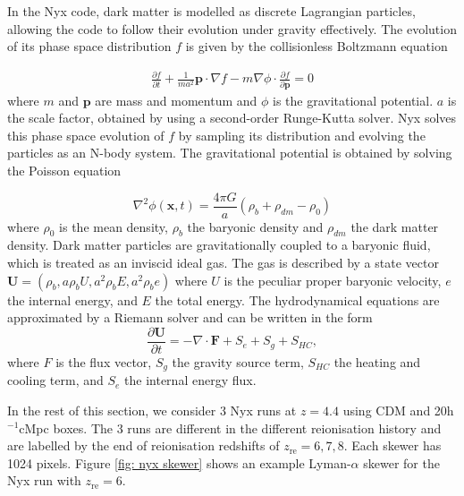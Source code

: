 In the Nyx code, dark matter is modelled as discrete Lagrangian particles, allowing the code to follow their evolution under gravity effectively. The evolution of its phase space distribution $f$ is given by the collisionless Boltzmann equation

\begin{equation}
    \begin{aligned}\frac{\partial f}{\partial t}+\frac{1}{ma^2}\mathbf{p}\cdot\nabla f-m\nabla\phi\cdot\frac{\partial f}{\partial\mathbf{p}}=0\end{aligned}
\end{equation}
where $m$ and $\mathbf{p}$ are mass and momentum and $\phi$ is the gravitational potential. $a$ is the scale factor, obtained by using a second-order Runge-Kutta solver.
Nyx solves this phase space evolution of $f$ by sampling its distribution and evolving the particles as an N-body system. The gravitational potential is obtained by solving the Poisson equation

\begin{equation}
    \nabla^2\phi(\mathbf{x},t)=\frac{4\pi G}{a}(\rho_b+\rho_{dm}-\rho_0)
\end{equation}
where $\rho_0$ is the mean density, $\rho_b$ the baryonic density and $\rho_{dm}$ the dark matter density.
Dark matter particles are gravitationally coupled to a baryonic fluid, which is treated as an inviscid ideal gas. The gas is described by a state vector $\mathbf{U}=(\rho_b,a\rho_bU,a^2\rho_bE,a^2\rho_be)$ where $U$ is the peculiar proper baryonic velocity, $e$ the internal energy, and $E$ the total energy.
The hydrodynamical equations are approximated by a Riemann solver and can be written in the form
\begin{equation}
    \frac{\partial\mathbf{U}}{\partial t}=-\nabla\cdot\mathbf{F}+S_e+S_g+S_{HC},
\end{equation}
where $F$ is the flux vector, $S_g$ the gravity source term, $S_{HC}$ the heating and cooling term, and $S_e$ the internal energy flux.

In the rest of this section, we consider 3 Nyx runs at $z=4.4$ using CDM and 20h$^{-1}$cMpc boxes. The 3 runs are different in the different reionisation history and are labelled by the end of reionisation redshifts of $z_\mathrm{re}=6,7,8$. Each skewer has 1024 pixels. Figure \ref{fig: nyx skewer} shows an example Lyman-$\alpha$ skewer for the Nyx run with $z_\mathrm{re}=6$.


